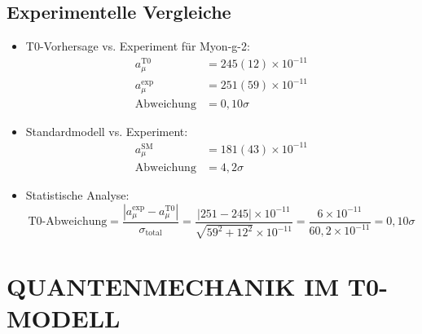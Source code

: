 \documentclass[12pt,a4paper]{article}
\begin{document}
	\subsection{Experimentelle Vergleiche}
	\begin{itemize}
		\item T0-Vorhersage vs. Experiment f\"{u}r Myon-g-2:
		\begin{align*}
			a_\mu^{\text{T0}} &= 245(12) \times 10^{-11}\\
			a_\mu^{\text{exp}} &= 251(59) \times 10^{-11}\\
			\text{Abweichung} &= 0,10\sigma
		\end{align*}
		
		\item Standardmodell vs. Experiment:
		\begin{align*}
			a_\mu^{\text{SM}} &= 181(43) \times 10^{-11}\\
			\text{Abweichung} &= 4,2\sigma
		\end{align*}
		
		\item Statistische Analyse:
		$$\text{T0-Abweichung} = \frac{|a_\mu^{\text{exp}} - a_\mu^{\text{T0}}|}{\sigma_{\text{total}}} = \frac{|251 - 245| \times 10^{-11}}{\sqrt{59^2 + 12^2} \times 10^{-11}} = \frac{6 \times 10^{-11}}{60,2 \times 10^{-11}} = 0,10\sigma$$
	\end{itemize}
	
	\section{QUANTENMECHANIK IM T0-MODELL}
	
\end{document}

